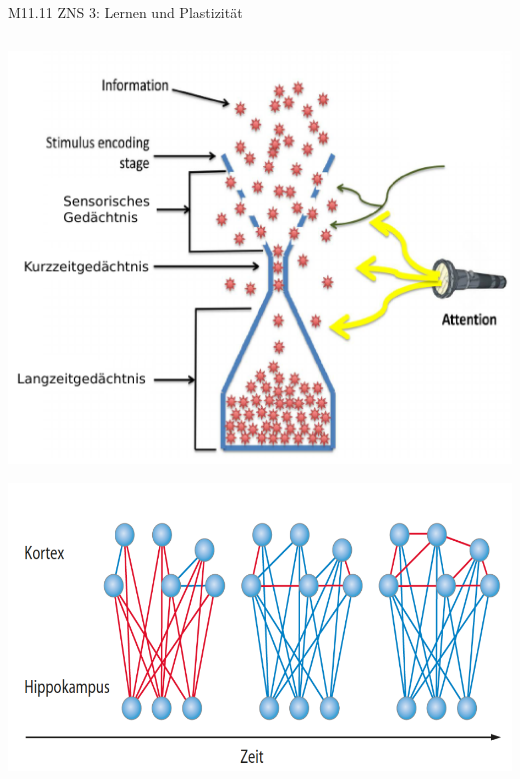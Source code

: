 \documentclass{beamer}
\begin{document}
\begin{frame}{M11.11 ZNS 3: Lernen und Plastizität} 

\begin{columns}[c]

\begin{column}{5cm}
\begin{center}
\includegraphics[width=\textwidth]{ultrakurzlang.png}
\end{center}

\begin{center}
\includegraphics[width=\textwidth]{konsolidierung.png}
\end{center}


\end{column}


\end{columns}
\end{frame}
\end{document}
